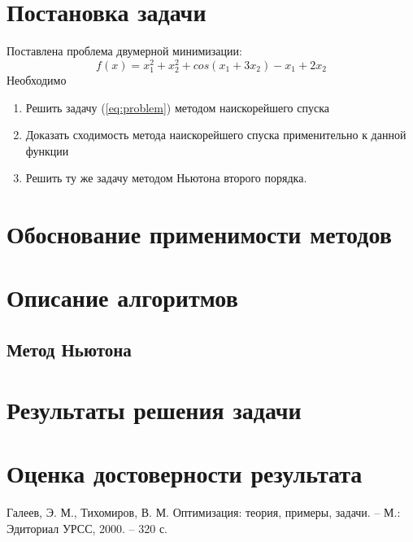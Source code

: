 \documentclass[main.tex]{subfiles}
\begin{document}
	
\section{Постановка задачи}
Поставлена проблема двумерной минимизации:
\begin{equation}\label{eq:problem}
f(x)=x_1^2+x_2^2+cos(x_1+3x_2)-x_1+2x_2
\end{equation}
Необходимо
\begin{enumerate}
	\item Решить задачу (\ref{eq:problem}) методом наискорейшего спуска
	\item Доказать сходимость метода наискорейшего спуска применительно к данной функции
	\item Решить ту же задачу методом Ньютона второго порядка.
\end{enumerate}

\section{Обоснование применимости методов}
\section{Описание алгоритмов}

\subsection{Метод Ньютона}

\section{Результаты решения задачи}
\section{Оценка достоверности результата}

\begin{thebibliography}{99}
	 Галеев, Э. М., Тихомиров, В. М. Оптимизация: теория, примеры, задачи. -- М.: Эдиториал УРСС, 2000. -- 320 с.
\end{thebibliography}
\end{document}
